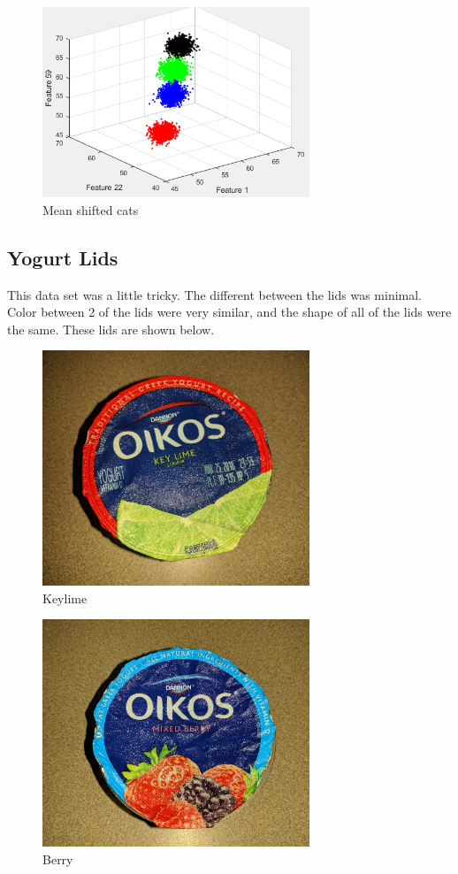\documentclass[12pt, letterpaper]{article}
\begin{document}
\begin{figure}[H]
\centering
\includegraphics[width=8cm]{meanshifted}
\caption{{Mean shifted cats}}
\label{fig:msc}
\end{figure}


\subsection{Yogurt Lids}

This data set was a little tricky. The different between the lids was minimal. Color between 2 of the lids were very similar, and the shape of all of the lids were the same. These lids are shown below.\\

\begin{figure}[H]
\centering
\includegraphics[width=8cm]{keylime}
\caption{{Keylime}}
\label{fig:keylime}
\end{figure}

\begin{figure}[H]
\centering
\includegraphics[width=8cm]{berry}
\caption{{Berry}}
\label{fig:berry}
\end{figure}
\end{document}
